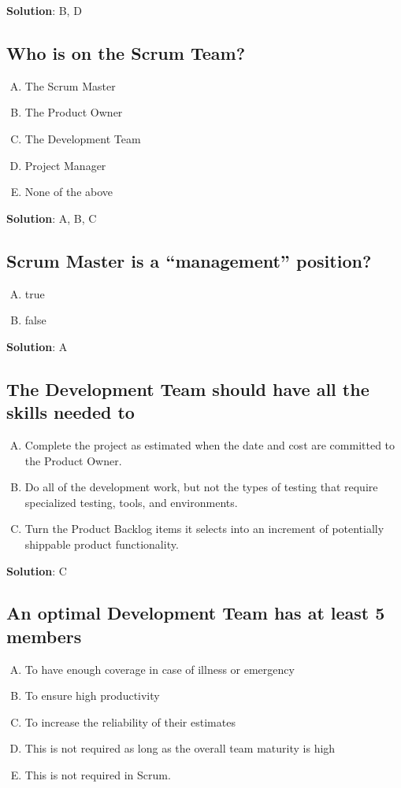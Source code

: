 \textbf{Solution}: B, D


\subsection{Who is on the Scrum Team?}

\begin{enumerate}[A)]
  \item The Scrum Master
  \item The Product Owner
  \item The Development Team
  \item Project Manager
  \item None of the above
\end{enumerate}


\textbf{Solution}: A, B, C


\subsection{Scrum Master is a \enquote{management} position?}
\begin{enumerate}[A)]
  \item true
  \item false
\end{enumerate}


\textbf{Solution}: A


\subsection{The Development Team should have all the skills needed to}
\begin{enumerate}[A)]
  \item Complete the project as estimated when the date and cost are committed to the Product Owner.
  \item Do all of the development work, but not the types of testing that require specialized testing, tools, and environments.
  \item Turn the Product Backlog items it selects into an increment of potentially shippable product functionality.
\end{enumerate}


\textbf{Solution}: C


\subsection{An optimal Development Team has at least 5 members}
\begin{enumerate}[A)]
  \item To have enough coverage in case of illness or emergency
  \item To ensure high productivity
  \item To increase the reliability of their estimates
  \item This is not required as long as the overall team maturity is high
  \item This is not required in Scrum.
\end{enumerate}


